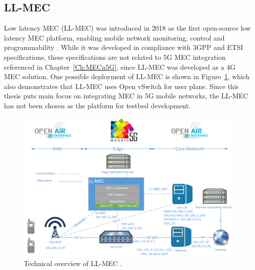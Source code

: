 \documentclass[12pt,a4paper,twoside]{report}
\begin{document}
\subsection{LL-MEC}
Low latency MEC (LL-MEC) was introduced in 2018 as the first open-source low latency MEC platform, enabling mobile network monitoring, control and programmability \cite{nikaein2018llmec}. While it was developed in compliance with 3GPP and ETSI specifications, these specifications are not related to 5G MEC integration referenced in Chapter~\ref{Ch:MECn5G}, since LL-MEC was developed as a 4G MEC solution. One possible deployment of LL-MEC is shown in Figure~\ref{F:llmec}, which also demonstrates that LL-MEC uses Open vSwitch for user plane. Since this thesis puts main focus on integrating MEC in 5G mobile networks, the LL-MEC has not been chosen as the platform for testbed development.
\begin{figure}[ht]
	\centering
	\includegraphics[width=13cm]{./images/ll-mec.png} 
	\caption{Technical overview of LL-MEC \cite{nikaein2018llmec}.}
	\label{F:llmec}
\end{figure}
\end{document}
